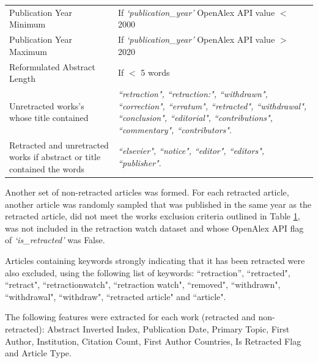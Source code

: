\documentclass[pdflatex,sn-mathphys-num]{sn-jnl}
\begin{document}
\begin{table}
\begin{tabularx}{\textwidth}{>{\hspace{0pt}}p{}>{\raggedright\arraybackslash\hspace{0pt}}X}
		Publication Year Minimum                                                 & If \textit{`publication\_year'} OpenAlex API value \(<\) 2000                                                                                                                                \\
		Publication Year Maximum                                                 & If \textit{`publication\_year'} OpenAlex API value \(>\) 2020                                                                                                                                \\
		Reformulated Abstract Length                                             & If \(<\) 5 words                                                                                                                                                                             \\
		Unretracted works's whose title contained                                & \textit{``retraction", ``retraction:", ``withdrawn", ``correction", ``erratum", ``retracted", ``withdrawal", ``conclusion", ``editorial", ``contributions", ``commentary", ``contributors"}. \\
		Retracted and unretracted works if abstract or title contained the words & \textit{``elsevier", ``notice", ``editor", ``editors", ``publisher"}.                                                                                                                        \\
		\bottomrule
	\end{tabularx}
	\label{tab:Works_Criteria}
\end{table}


Another set of non-retracted articles was formed. For each retracted article, another article was randomly sampled that was published in the same year as the retracted article, did not meet the works exclusion criteria outlined in Table \ref{tab:Works_Criteria}, was not included in the retraction watch dataset and whose OpenAlex API flag of \textit{`is\_retracted'} was False.


Articles containing keywords strongly indicating that it has been retracted were also excluded, using the following list of keywords: ``retraction'', ``retracted", ``retract", ``retractionwatch", ``retraction watch", ``removed", ``withdrawn", ``withdrawal", ``withdraw", ``retracted article" and ``article".


The following features were extracted for each work (retracted and non-retracted): Abstract Inverted Index, Publication Date, Primary Topic, First Author, Institution, Citation Count, First Author Countries, Is Retracted Flag and Article Type.
\end{document}
